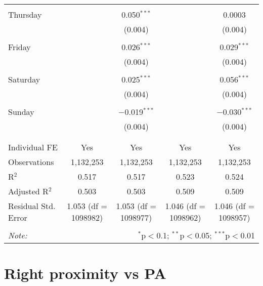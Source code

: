 \documentclass[
]{article}
\begin{document}
\begin{table}[!htbp]
{\begin{tabular}{@{\extracolsep{5pt}}lcccc}
  & & & & \\ 
 Thursday &  & 0.050$^{***}$ &  & 0.0003 \\ 
  &  & (0.004) &  & (0.004) \\ 
  & & & & \\ 
 Friday &  & 0.026$^{***}$ &  & 0.029$^{***}$ \\ 
  &  & (0.004) &  & (0.004) \\ 
  & & & & \\ 
 Saturday &  & 0.025$^{***}$ &  & 0.056$^{***}$ \\ 
  &  & (0.004) &  & (0.004) \\ 
  & & & & \\ 
 Sunday &  & $-$0.019$^{***}$ &  & $-$0.030$^{***}$ \\ 
  &  & (0.004) &  & (0.004) \\ 
  & & & & \\ 
\hline \\[-1.8ex] 
Individual FE & Yes & Yes & Yes & Yes \\ 
Observations & 1,132,253 & 1,132,253 & 1,132,253 & 1,132,253 \\ 
R$^{2}$ & 0.517 & 0.517 & 0.523 & 0.524 \\ 
Adjusted R$^{2}$ & 0.503 & 0.503 & 0.509 & 0.509 \\ 
Residual Std. Error & 1.053 (df = 1098982) & 1.053 (df = 1098977) & 1.046 (df = 1098962) & 1.046 (df = 1098957) \\ 
\hline 
\hline \\[-1.8ex] 
\textit{Note:}  & \multicolumn{4}{r}{$^{*}$p$<$0.1; $^{**}$p$<$0.05; $^{***}$p$<$0.01} \\ 
\end{tabular}
} 
\end{table} 
\newpage
\section{Right proximity vs PA}
\end{document}

